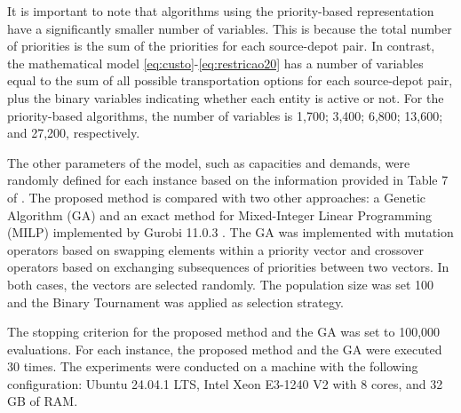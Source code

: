 \documentclass[sn-nature]{sn-jnl}%
\theoremstyle{thmstyleone}%
\theoremstyle{thmstyletwo}%
\theoremstyle{thmstylethree}%
\begin{document}
It is important to note that algorithms using the priority-based representation have a significantly smaller number of variables. This is because the total number of priorities is the sum of the priorities for each source-depot pair. In contrast, the mathematical model \eqref{eq:custo}-\eqref{eq:restricao20} has a number of variables equal to the sum of all possible transportation options for each source-depot pair, plus the binary variables indicating whether each entity is active or not. For the priority-based algorithms, the number of variables is 1,700; 3,400; 6,800; 13,600; and 27,200, respectively.

The other parameters of the model, such as capacities and demands, were randomly defined for each instance based on the information provided in Table 7 of \cite{rajabi2023utilizing}. The proposed method is compared with two other approaches: a Genetic Algorithm (GA) and an exact method for Mixed-Integer Linear Programming (MILP) implemented by Gurobi 11.0.3 \cite{gurobi}. The GA was implemented with mutation operators based on swapping elements within a priority vector and crossover operators based on exchanging subsequences of priorities between two vectors. In both cases, the vectors are selected randomly. The population size was set 100 and the Binary Tournament was applied as selection strategy.

The stopping criterion for the proposed method and the GA was set to 100,000 evaluations. For each instance, the proposed method and the GA were executed 30 times. The experiments were conducted on a machine with the following configuration: Ubuntu 24.04.1 LTS, Intel Xeon E3-1240 V2 with 8 cores, and 32 GB of RAM.
\end{document}
